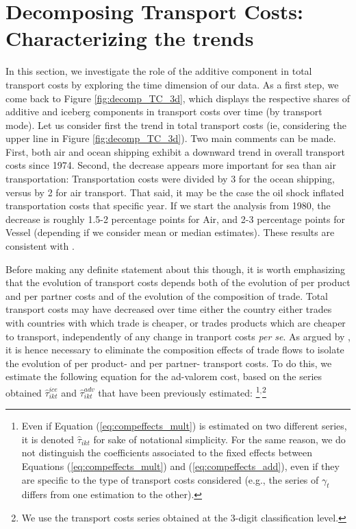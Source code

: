 \documentclass[a4paper,11pt]{article}
\begin{document}
\smallskip


\section{Decomposing Transport Costs: Characterizing the trends \label{sec:results_trends}}

In this section, we investigate the role of the additive component in total transport costs by exploring the time dimension of our data. As a first step, we come back to Figure \ref{fig:decomp_TC_3d}, which displays the respective shares of additive and iceberg components in transport costs over time (by transport mode).
Let us consider first the trend in total transport costs (ie, considering the upper line in Figure \ref{fig:decomp_TC_3d}). Two main comments can be made. First, both air and ocean shipping exhibit a downward trend in overall transport costs since 1974. Second, the decrease appears more important for sea than air transportation: Transportation costs were divided by 3 for the ocean shipping, versus by 2 for air transport. That said, it may be the case the oil shock inflated transportation costs that specific year. If we start the analysis from 1980, the decrease is roughly 1.5-2 percentage points for Air, and 2-3 percentage points for Vessel (depending if we consider mean or median estimates). These results are consistent with \citet{hummels2007}.

Before making any definite statement about this though, it is worth emphasizing that the evolution of transport costs depends both of the evolution of per product and per partner costs and of the evolution of the composition of trade.
Total transport costs may have decreased over time either the country either trades with countries with which trade is cheaper, or trades products which are cheaper to transport, independently of any change in tranport costs \textit{per se}. As argued by \citet{hummels2007}, it is hence necessary to eliminate the composition effects of trade flows to isolate the evolution of per product- and per partner- transport costs. To do this, we estimate the following equation for the ad-valorem cost, based on the series obtained $\widehat{\tau}_{ikt}^{ice}$ and $\widehat{\tau}_{ikt}^{adv}$ that have been previously estimated:
\footnote{Even if Equation (\ref{eq:compeffects_mult}) is estimated on two different series, it is denoted $\widehat{\tau}_{ikt}$ for sake of notational simplicity. For the same reason, we do not distinguish the coefficients associated to the fixed effects between Equations (\ref{eq:compeffects_mult}) and (\ref{eq:compeffects_add}), even if they are specific to the type of transport costs considered (e.g., the series of $\gamma_t$ differs from one estimation to the other).}$^{,}$\footnote{We use the transport costs series obtained at the 3-digit classification level.}
\end{document}
